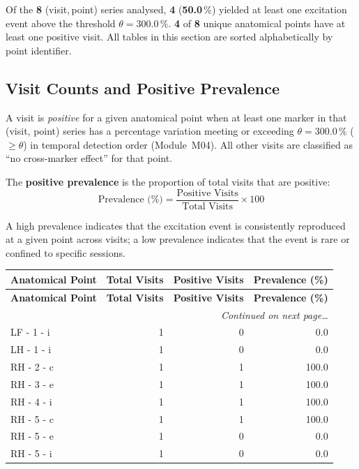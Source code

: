 \documentclass[a4paper,11pt]{article}
\begin{document}
\noindent
Of the \textbf{8} (visit,\,point) series analysed,
\textbf{4} (\textbf{50.0}\,\%) yielded at least one
excitation event above the threshold $\theta = 300.0\,\%$.
\textbf{4} of \textbf{8} unique anatomical points
have at least one positive visit.
All tables in this section are sorted alphabetically by point identifier.

\subsection{Visit Counts and Positive Prevalence}

A visit is \emph{positive} for a given anatomical point when at least one marker in that
(visit, point) series has a percentage variation meeting or exceeding
$\theta = 300.0\,\%$ ($\geq \theta$) in temporal detection order (Module~M04).
All other visits are classified as ``no cross-marker effect'' for that point.

The \textbf{positive prevalence} is the proportion of total visits that are positive:
\[
  \text{Prevalence (\%)} = \frac{\text{Positive Visits}}{\text{Total Visits}} \times 100
\]

A high prevalence indicates that the excitation event is consistently reproduced at a given
point across visits; a low prevalence indicates that the event is rare or confined to
specific sessions.

\begin{small}
\begin{longtable}{p{5cm}rrr}
\toprule
\textbf{Anatomical Point} &
\textbf{Total Visits} &
\textbf{Positive Visits} &
\textbf{Prevalence (\%)} \\
\midrule
\endfirsthead
\toprule
\textbf{Anatomical Point} &
\textbf{Total Visits} &
\textbf{Positive Visits} &
\textbf{Prevalence (\%)} \\
\midrule
\endhead
\midrule
\multicolumn{4}{r}{\small\emph{Continued on next page\ldots}} \\
\endfoot
\bottomrule
\endlastfoot
LF - 1 - i & 1 & 0 & 0.0 \\
LH - 1 - i & 1 & 0 & 0.0 \\
RH - 2 - c & 1 & 1 & 100.0 \\
RH - 3 - e & 1 & 1 & 100.0 \\
RH - 4 - i & 1 & 1 & 100.0 \\
RH - 5 - c & 1 & 1 & 100.0 \\
RH - 5 - e & 1 & 0 & 0.0 \\
RH - 5 - i & 1 & 0 & 0.0 \\
\end{longtable}
\end{small}
\end{document}
